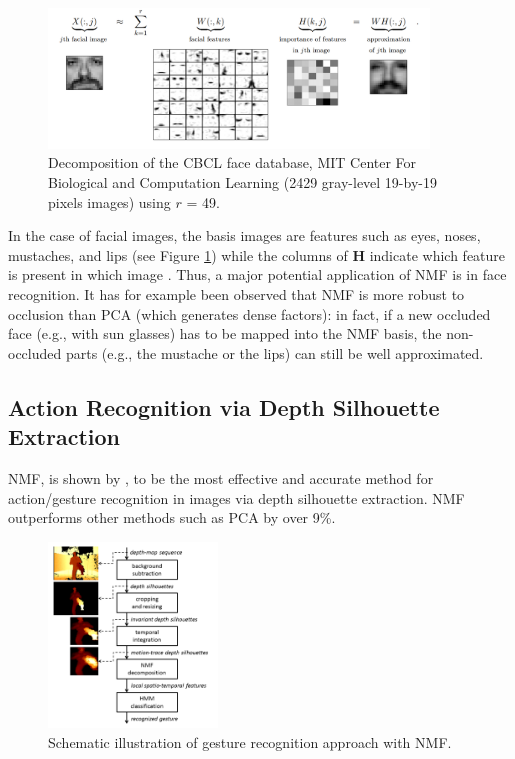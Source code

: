 \documentclass[11pt]{article}
\begin{document}
\FloatBarrier
\begin{figure}[!htbp]
\centering
\includegraphics[width=0.9\textwidth]{face_decomp}
\caption{Decomposition of the CBCL face database, MIT Center For Biological and Computation Learning
(2429 gray-level 19-by-19 pixels images) using $r$ = 49.} 
\label{fig3}
\end{figure}
\FloatBarrier

In the case of facial images, the basis images are features such as eyes, noses, mustaches, and lips (see Figure \ref{fig3}) while the columns of $\mathbf{H}$ indicate which feature is present in which image \cite{93}. Thus, a major potential application of NMF is in face recognition. It has for example been observed that NMF is more robust to occlusion than PCA (which generates dense factors): in fact, if a new occluded face (e.g., with sun glasses) has to be mapped into the NMF basis, the non-occluded parts (e.g., the mustache or the lips) can still be well approximated.

\subsection{Action Recognition via Depth Silhouette Extraction}
NMF, is shown by \cite{action}, to be the most effective and accurate method for action/gesture recognition in images via depth silhouette extraction. NMF outperforms other methods such as PCA by over 9\%.

\FloatBarrier
\begin{figure}
\begin{center}
\includegraphics[width=0.4\textwidth]{gesture}
\end{center}
\caption{Schematic illustration of gesture recognition approach with NMF.} 
\label{fig4}
\end{figure}
\FloatBarrier
\end{document}

